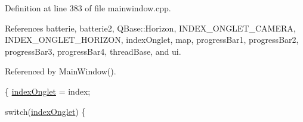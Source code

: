Definition at line 383 of file mainwindow.\-cpp.



References batterie, batterie2, Q\-Base\-::\-Horizon, I\-N\-D\-E\-X\-\_\-\-O\-N\-G\-L\-E\-T\-\_\-\-C\-A\-M\-E\-R\-A, I\-N\-D\-E\-X\-\_\-\-O\-N\-G\-L\-E\-T\-\_\-\-H\-O\-R\-I\-Z\-O\-N, index\-Onglet, map, progress\-Bar1, progress\-Bar2, progress\-Bar3, progress\-Bar4, thread\-Base, and ui.



Referenced by Main\-Window().


\begin{DoxyCode}
\{
    \hyperlink{classMainWindow_a2cf797221c17fdcce7888b123bd5847b}{indexOnglet} = index;

    \textcolor{keywordflow}{switch}(\hyperlink{classMainWindow_a2cf797221c17fdcce7888b123bd5847b}{indexOnglet}) \{


\end{DoxyCode}
